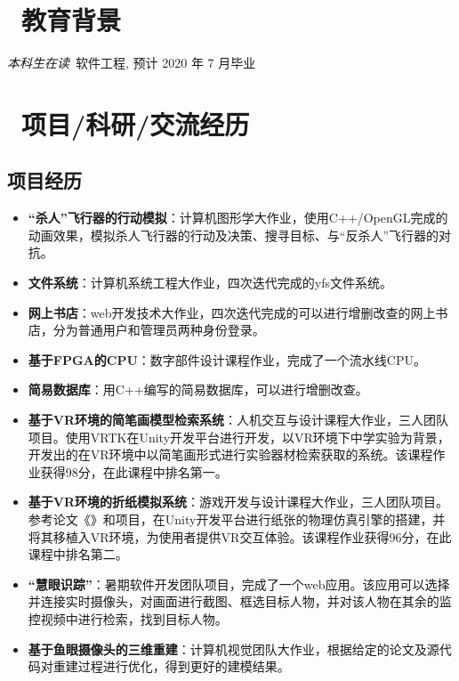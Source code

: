 \documentclass{resume}
\begin{document}


  
\section{\faGraduationCap\  教育背景}
\textit{本科生在读}\ 软件工程, 预计 2020 年 7 月毕业

\section{\faUsers\ 项目/科研/交流经历}
\subsection{\textbf{项目经历}}
\begin{itemize}
  \item \textbf{“杀人”飞行器的行动模拟}：计算机图形学大作业，使用C++/OpenGL完成的动画效果，模拟杀人飞行器的行动及决策、搜寻目标、与“反杀人”飞行器的对抗。
  \item \textbf{文件系统}：计算机系统工程大作业，四次迭代完成的yfs文件系统。
  \item \textbf{网上书店}：web开发技术大作业，四次迭代完成的可以进行增删改查的网上书店，分为普通用户和管理员两种身份登录。
  \item \textbf{基于FPGA的CPU}：数字部件设计课程作业，完成了一个流水线CPU。
  \item \textbf{简易数据库}：用C++编写的简易数据库，可以进行增删改查。
\end{itemize}

\begin{itemize}
  \item \textbf{基于VR环境的简笔画模型检索系统}：人机交互与设计课程大作业，三人团队项目。使用VRTK在Unity开发平台进行开发，以VR环境下中学实验为背景，开发出的在VR环境中以简笔画形式进行实验器材检索获取的系统。该课程作业获得98分，在此课程中排名第一。
  \item \textbf{基于VR环境的折纸模拟系统}：游戏开发与设计课程大作业，三人团队项目。参考论文《》和项目，在Unity开发平台进行纸张的物理仿真引擎的搭建，并将其移植入VR环境，为使用者提供VR交互体验。该课程作业获得96分，在此课程中排名第二。
  \item \textbf{“慧眼识踪”}：暑期软件开发团队项目，完成了一个web应用。该应用可以选择并连接实时摄像头，对画面进行截图、框选目标人物，并对该人物在其余的监控视频中进行检索，找到目标人物。
  \item \textbf{基于鱼眼摄像头的三维重建}：计算机视觉团队大作业，根据给定的论文及源代码对重建过程进行优化，得到更好的建模结果。
  \end{itemize}
\end{document}
